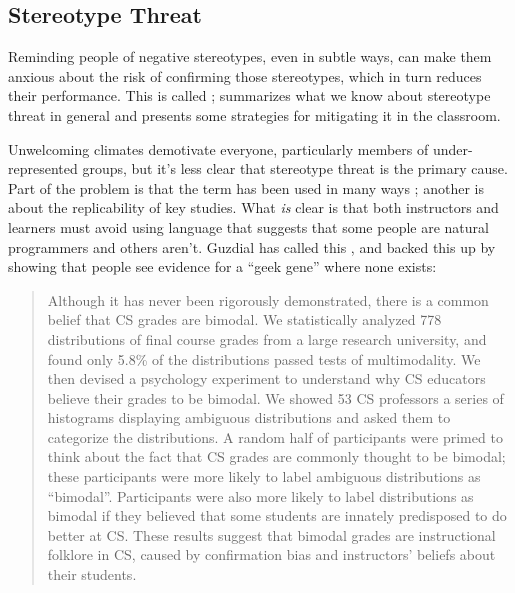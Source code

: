 \subsection*{Stereotype Threat}

Reminding people of negative stereotypes, even in subtle ways, can make
them anxious about the risk of confirming those stereotypes, which in
turn reduces their performance. This is called
; \cite{Stee2011}
summarizes what we know about stereotype threat in general and presents
some strategies for mitigating it in the classroom.

Unwelcoming climates demotivate everyone, particularly members of
under-represented groups, but it's less clear that stereotype threat
is the primary cause. Part of the problem is that the term has been
used in many ways \cite{Shap2007}; another is
 about the replicability of
key studies. What \emph{is} clear is that both instructors and learners
must avoid using language that suggests that some people are natural
programmers and others aren't. Guzdial has called this , and
\cite{Pati2016} backed this up by showing that people see evidence
for a ``geek gene'' where none exists:

\begin{quote}

Although it has never been rigorously demonstrated, there is a common
belief that CS grades are bimodal. We statistically analyzed 778
distributions of final course grades from a large research university,
and found only 5.8\% of the distributions passed tests of
multimodality. We then devised a psychology experiment to understand
why CS educators believe their grades to be bimodal. We showed 53 CS
professors a series of histograms displaying ambiguous distributions
and asked them to categorize the distributions. A random half of
participants were primed to think about the fact that CS grades are
commonly thought to be bimodal; these participants were more likely to
label ambiguous distributions as ``bimodal''. Participants were also
more likely to label distributions as bimodal if they believed that
some students are innately predisposed to do better at CS. These
results suggest that bimodal grades are instructional folklore in CS,
caused by confirmation bias and instructors' beliefs about their
students.

\end{quote}

